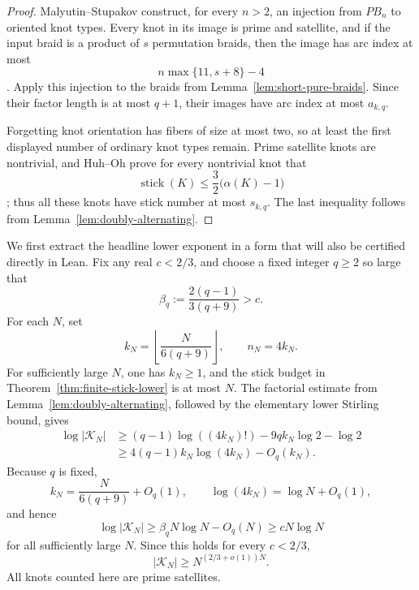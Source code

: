 \documentclass[11pt]{article}
\theoremstyle{remark}
\theoremstyle{plain}
\newcommand{\Kcal}{\mathcal{K}}
\begin{document}
\begin{proof}
Malyutin--Stupakov construct, for every \(n>2\), an injection from \(PB_n\)
to oriented knot types.  Every knot in its image is prime and satellite, and
if the input braid is a product of \(s\) permutation braids, then the image has
arc index at most
\[
    n\max\{11,s+8\}-4
\]
\cite[Proposition 1, pp.~3--4]{MalyutinStupakovArc}.  Apply this injection to
the braids from Lemma~\ref{lem:short-pure-braids}.  Since their factor length
is at most \(q+1\), their images have arc index at most \(a_{k,q}\).

Forgetting knot orientation has fibers of size at most two, so at least the
first displayed number of ordinary knot types remain.  Prime satellite knots
are nontrivial, and Huh--Oh prove for every nontrivial knot that
\[
    \operatorname{stick}(K)
       \le\frac32\bigl(\alpha(K)-1\bigr)
\]
\cite[Theorem 3]{HuhOh}; thus all these knots have stick number at most
\(s_{k,q}\).  The last inequality follows from
Lemma~\ref{lem:doubly-alternating}.
\end{proof}

We first extract the headline lower exponent in a form that will also be
certified directly in Lean.  Fix any real \(c<2/3\), and choose a fixed integer
\(q\ge2\) so large that
\[
    \beta_q:=\frac{2(q-1)}{3(q+9)}>c.
\]
For each \(N\), set
\[
    k_N=\left\lfloor\frac{N}{6(q+9)}\right\rfloor,
    \qquad n_N=4k_N.
\]
For sufficiently large \(N\), one has \(k_N\ge1\), and the stick budget in
Theorem~\ref{thm:finite-stick-lower} is at most \(N\).  The factorial estimate from
Lemma~\ref{lem:doubly-alternating}, followed by the elementary lower Stirling
bound, gives
\[
 \begin{aligned}
 \log|\Kcal_N|
 &\ge (q-1)\log((4k_N)!)-9qk_N\log2-\log2\\
 &\ge 4(q-1)k_N\log(4k_N)-O_q(k_N).
 \end{aligned}
\]
Because \(q\) is fixed,
\[
    k_N=\frac{N}{6(q+9)}+O_q(1),
    \qquad \log(4k_N)=\log N+O_q(1),
\]
and hence
\[
    \log|\Kcal_N|\ge \beta_qN\log N-O_q(N)
       \ge cN\log N
\]
for all sufficiently large \(N\).  Since this holds for every \(c<2/3\),
\[
    |\Kcal_N|\ge N^{(2/3+o(1))N}.
\]
All knots counted here are prime satellites.
\end{document}

